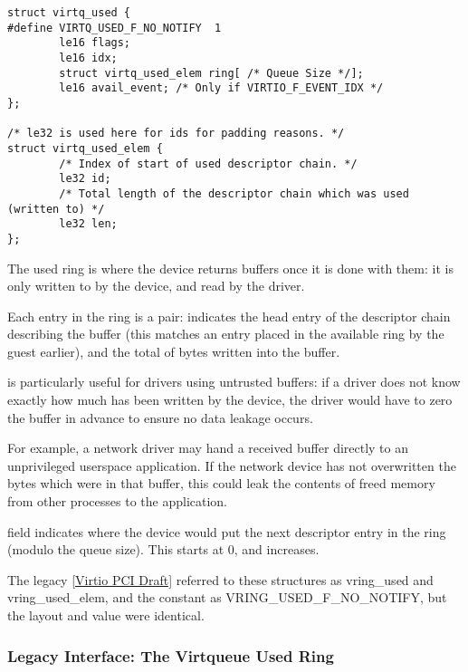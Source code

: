 \begin{lstlisting}
struct virtq_used {
#define VIRTQ_USED_F_NO_NOTIFY  1
        le16 flags;
        le16 idx;
        struct virtq_used_elem ring[ /* Queue Size */];
        le16 avail_event; /* Only if VIRTIO_F_EVENT_IDX */
};

/* le32 is used here for ids for padding reasons. */
struct virtq_used_elem {
        /* Index of start of used descriptor chain. */
        le32 id;
        /* Total length of the descriptor chain which was used (written to) */
        le32 len;
};
\end{lstlisting}

The used ring is where the device returns buffers once it is done with
them: it is only written to by the device, and read by the driver.

Each entry in the ring is a pair:  indicates the head entry of the
descriptor chain describing the buffer (this matches an entry
placed in the available ring by the guest earlier), and  the total
of bytes written into the buffer.

\begin{note}
 is particularly useful
for drivers using untrusted buffers: if a driver does not know exactly
how much has been written by the device, the driver would have to zero
the buffer in advance to ensure no data leakage occurs.

For example, a network driver may hand a received buffer directly to
an unprivileged userspace application.  If the network device has not
overwritten the bytes which were in that buffer, this could leak the
contents of freed memory from other processes to the application.
\end{note}

 field indicates where the device would put the next descriptor
entry in the ring (modulo the queue size). This starts at 0, and increases.

\begin{note}
The legacy \hyperref[intro:Virtio PCI Draft]{[Virtio PCI Draft]}
referred to these structures as vring_used and vring_used_elem, and
the constant as VRING_USED_F_NO_NOTIFY, but the layout and value were
identical.
\end{note}

\subsubsection{Legacy Interface: The Virtqueue Used
Ring}\label{sec:Basic Facilities of a Virtio Device / Virtqueues
/ The Virtqueue Used Ring/ Legacy Interface: The Virtqueue Used
Ring}

